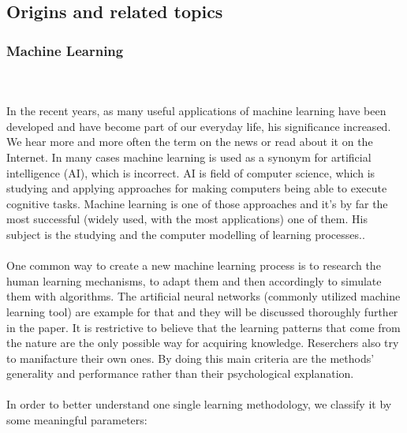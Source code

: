 \documentclass[runningheads,a4paper]{llncs}[2015/06/24]
\begin{document}
	\subsection{Origins and related topics}
		\subsubsection{Machine Learning}\hspace{1cm}\\\\ 
In the recent years, as many useful applications of machine learning have been developed and have become part of our everyday life, his significance increased. We hear more and more often the term on the news or read about it on the Internet. In many cases machine learning is used as a synonym for artificial intelligence (AI), which is incorrect. AI is field of computer science, which is studying and  applying approaches for making computers being able to execute cognitive tasks\cite{AIvsML}. Machine learning is one of those approaches and it's by far the most successful (widely used, with the most applications) one of them\cite{quinlan1986induction}. His subject is the studying and the computer modelling of learning processes.\cite{Michalski1983}. \\\\ One common way to create a new machine learning process is to research the human learning mechanisms, to adapt them and then accordingly to simulate them  with algorithms. The artificial neural networks (commonly utilized machine learning tool) are example for that and they will be discussed thoroughly further in the paper. It is  restrictive to believe that the learning patterns that come from the nature are the only possible way for acquiring knowledge. Reserchers also try to manifacture their own ones. By doing this main criteria are the methods'  generality and performance rather than their psychological explanation\cite{Michalski1983}.\\\\ 
In order to better understand one single learning methodology, we classify it by some meaningful parameters:
\end{document}
